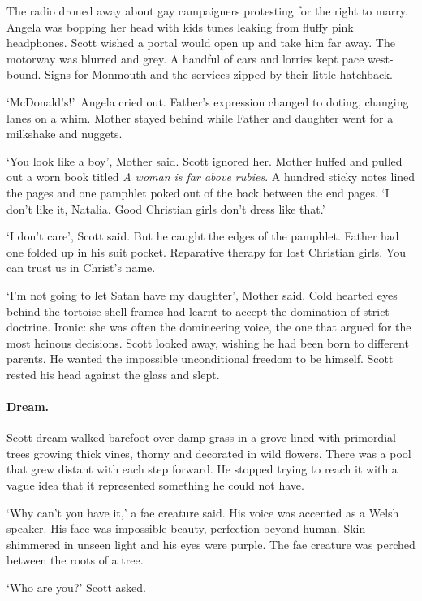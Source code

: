 The radio droned away about gay campaigners protesting for the right
to marry. Angela was bopping her head with kids tunes leaking from fluffy
pink headphones. Scott wished a portal would open up and take him far
away. The motorway was blurred and grey. A handful of cars and lorries kept
pace west-bound. Signs for Monmouth and the services zipped by their
little hatchback.

`McDonald's!'~Angela cried out. Father's expression changed to
doting, changing lanes on a whim. Mother stayed behind while Father
and daughter went for a milkshake and nuggets.

`You look like a boy', Mother said. Scott ignored her. Mother huffed
and pulled out a worn book titled \textit{A woman is far above rubies}. A
hundred sticky notes lined the pages and one pamphlet poked out of the
back between the end pages. `I don't like it, Natalia. Good Christian
girls don't dress like that.'

`I don't care', Scott said. But he caught the edges of the
pamphlet. Father had one folded up in his suit pocket. Reparative
therapy for lost Christian girls. You can trust us in Christ's name.

`I'm not going to let Satan have my daughter', Mother said. Cold
hearted eyes behind the tortoise shell frames had learnt to accept the
domination of strict doctrine. Ironic: she was often the domineering
voice, the one that argued for the most heinous decisions. Scott
looked away, wishing he had been born to different parents. He wanted
the impossible unconditional freedom to be himself. Scott rested his
head against the glass and slept.

\paragraph{Dream.}

Scott dream-walked barefoot over damp grass in a grove lined with
primordial trees growing thick vines, thorny and decorated in wild
flowers. There was a pool that grew distant with each step forward. He
stopped trying to reach it with a vague idea that it represented something he
could not have.

`Why can't you have it,' a fae creature said. His voice was accented
as a Welsh speaker. His face was impossible beauty, perfection beyond
human. Skin shimmered in unseen light and his eyes were purple. The
fae creature was perched between the roots of a tree.

`Who are you?' Scott asked.

